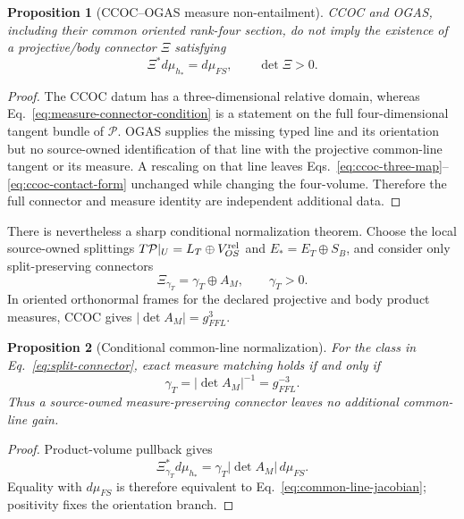 \documentclass[11pt]{article}
\newtheorem{proposition}{Proposition}
\begin{document}
\begin{proposition}[CCOC--OGAS measure non-entailment]
CCOC and OGAS, including their common oriented rank-four section, do not imply
the existence of a projective/body connector $\Xi$ satisfying
\begin{equation}
 \Xi^*d\mu_{h_*}=d\mu_{FS},
 \qquad \det\Xi>0.
 \label{eq:measure-connector-condition}
\end{equation}
\end{proposition}

\begin{proof}
The CCOC datum has a three-dimensional relative domain, whereas
Eq.~\eqref{eq:measure-connector-condition} is a statement on the full
four-dimensional tangent bundle of $\mathcal P$.  OGAS supplies the missing
typed line and its orientation but no source-owned identification of that line
with the projective common-line tangent or its measure.  A rescaling on that
line leaves Eqs.~\eqref{eq:ccoc-three-map}--\eqref{eq:ccoc-contact-form}
unchanged while changing the four-volume.  Therefore the full connector and
measure identity are independent additional data.
\end{proof}

There is nevertheless a sharp conditional normalization theorem.  Choose the
local source-owned splittings
$T\mathcal P|_U=L_T\oplus V_{OS}^{\rm rel}$ and
$E_*=E_T\oplus S_B$, and consider only split-preserving connectors
\begin{equation}
 \Xi_{\gamma_T}=\gamma_T\oplus A_M,
 \qquad \gamma_T>0.
 \label{eq:split-connector}
\end{equation}
In oriented orthonormal frames for the declared projective and body product
measures, CCOC gives $|\det A_M|=g_{FFL}^{3}$.

\begin{proposition}[Conditional common-line normalization]
For the class in Eq.~\eqref{eq:split-connector}, exact measure matching holds
if and only if
\begin{equation}
 \gamma_T=|\det A_M|^{-1}=g_{FFL}^{-3}.
 \label{eq:common-line-jacobian}
\end{equation}
Thus a source-owned measure-preserving connector leaves no additional
common-line gain.
\end{proposition}

\begin{proof}
Product-volume pullback gives
\begin{equation}
 \Xi_{\gamma_T}^{*}d\mu_{h_*}
 =\gamma_T|\det A_M|\,d\mu_{FS}.
\end{equation}
Equality with $d\mu_{FS}$ is therefore equivalent to
Eq.~\eqref{eq:common-line-jacobian}; positivity fixes the orientation branch.
\end{proof}
\end{document}

